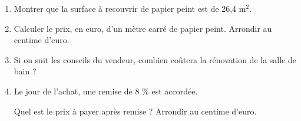\begin{enumerate}
	\item Montrer que la surface à recouvrir de papier peint est de 26,4 m$^2$.
	
	\item Calculer le prix, en euro, d’un mètre carré de papier peint.
	Arrondir au centime d'euro.
	
	\item Si on suit les conseils du vendeur, combien coûtera la rénovation de la salle de bain ?
		
	\item Le jour de l'achat, une remise de 8 \% est accordée.
		
	Quel est le prix à payer après remise ? Arrondir au centime d'euro.
\end{enumerate}

